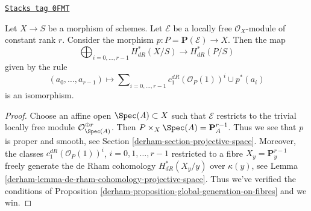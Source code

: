 \begin{proposition}
\label{derham-proposition-projective-space-bundle-formula}
\href{https://stacks.math.columbia.edu/tag/0FMT}{\texttt{Stacks tag 0FMT}}

Let $X \to S$ be a morphism of schemes. Let $\mathcal{E}$ be a locally
free $\mathcal{O}_X$-module of constant rank $r$. Consider the morphism
$p : P = \mathbf{P}(\mathcal{E}) \to X$.
Then the map
$$
\bigoplus\nolimits_{i = 0, \ldots, r - 1} H^*_{dR}(X/S)
\longrightarrow
H^*_{dR}(P/S)
$$
given by the rule
$$
(a_0, \ldots, a_{r - 1}) \longmapsto
\sum\nolimits_{i = 0, \ldots, r - 1} c_1^{dR}(\mathcal{O}_P(1))^i \cup p^*(a_i)
$$
is an isomorphism.
\end{proposition}

\begin{proof}

Choose an affine open $\Spec(A) \subset X$ such that $\mathcal{E}$ restricts
to the trivial locally free module $\mathcal{O}_{\Spec(A)}^{\oplus r}$.
Then $P \times_X \Spec(A) = \mathbf{P}^{r - 1}_A$. Thus we see that
$p$ is proper and smooth, see Section \ref{derham-section-projective-space}.
Moreover, the classes $c_1^{dR}(\mathcal{O}_P(1))^i$, $i = 0, 1, \ldots, r - 1$
restricted to a fibre $X_y = \mathbf{P}^{r - 1}_y$ freely generate the
de Rham cohomology $H^*_{dR}(X_y/y)$ over $\kappa(y)$, see
Lemma \ref{derham-lemma-de-rham-cohomology-projective-space}. Thus we've verified the
conditions of Proposition \ref{derham-proposition-global-generation-on-fibres}
and we win.
\end{proof}

